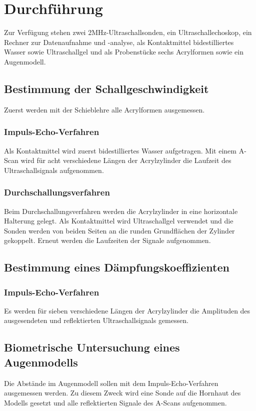 \section{Durchführung}
\label{sec:Durchführung}
Zur Verfügung stehen zwei 2MHz-Ultraschallsonden, ein Ultraschallechoskop,
ein Rechner zur Datenaufnahme und -analyse, als Kontaktmittel bidestilliertes Wasser sowie Ultraschallgel
und als Probenstücke sechs Acrylformen sowie ein Augenmodell.

\subsection{Bestimmung der Schallgeschwindigkeit}
Zuerst werden mit der Schieblehre alle Acrylformen ausgemessen. 
\subsubsection*{Impuls-Echo-Verfahren}
Als Kontaktmittel wird zuerst bidestilliertes Wasser aufgetragen.
Mit einem A-Scan wird für acht verschiedene Längen der Acrylzylinder die Laufzeit des 
Ultraschallsignals aufgenommen.


\subsubsection*{Durchschallungsverfahren}
Beim Durchschallungsverfahren werden die Acrylzylinder in eine horizontale Halterung gelegt.
Als Kontaktmittel wird Ultraschallgel verwendet und die Sonden werden von 
beiden Seiten an die runden Grundflächen der Zylinder gekoppelt.
Erneut werden die Laufzeiten der Signale aufgenommen. 


\subsection{Bestimmung eines Dämpfungskoeffizienten}
\subsubsection*{Impuls-Echo-Verfahren}
Es werden für sieben verschiedene Längen der Acrylzylinder die 
Amplituden des ausgesendeten und reflektierten Ultraschallsignals gemessen. 


\subsection{Biometrische Untersuchung eines Augenmodells}
Die Abstände im Augenmodell sollen mit dem Impuls-Echo-Verfahren ausgemessen werden. Zu diesem Zweck wird 
eine Sonde auf die Hornhaut des Modells gesetzt und alle reflektierten Signale des A-Scans aufgenommen. 